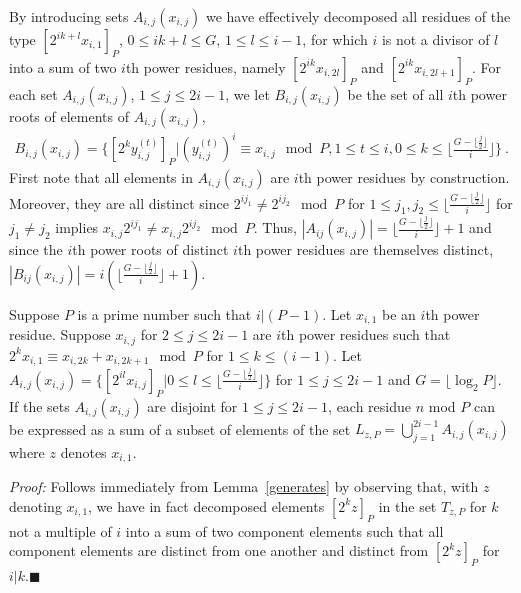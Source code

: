 By introducing sets $A_{i,j}(x_{i,j})$ we have effectively
decomposed all residues of the type $[2^{ik+l}x_{i,1}]_P$, $0 \leq
ik+l \leq G$, $1 \leq l \leq i-1$, for which $i$ is not a divisor of
$l$ into a sum of two $i$th power residues, namely
$[2^{ik}x_{i,2l}]_P$ and $[2^{ik}x_{i,2l+1}]_P$. For each set
$A_{i,j}(x_{i,j})$, $1 \leq j \leq 2i-1$, we let $B_{i,j}(x_{i,j})$
be the set of all $i$th power roots of elements of
$A_{i,j}(x_{i,j})$,
\begin{eqnarray}\label{bzi2l}
B_{i,j}(x_{i,j}) =\{ [2^{k}y_{i,j}^{(t)}]_P| (y_{i,j}^{(t)})^i
\equiv x_{i,j} \mod P, 1 \leq t \leq i, 0 \leq k \leq \lfloor
\frac{G-\lfloor \frac{j}{2} \rfloor}{i} \rfloor \}~.
\end{eqnarray}
First note that all elements in $A_{i,j}(x_{i,j})$ are $i$th power
residues by construction. Moreover, they are all distinct since
$2^{ij_1} \neq 2^{ij_2} \mod P$ for $1 \leq j_1,j_2 \leq \lfloor
\frac{G-\lfloor\frac{j}{2} \rfloor}{i} \rfloor$ for $j_1\neq j_2$
implies $x_{i,j}2^{ij_1} \neq x_{i,j}2^{ij_2} \mod P$. Thus,
$|A_{ij}(x_{i,j})|=\lfloor \frac{G-\lfloor \frac{j}{2}\rfloor}{i}
\rfloor+1$ and since the $i$th power roots of distinct $i$th power
residues are themselves distinct, $|B_{ij}(x_{i,j})|=i\left(\lfloor
\frac{G-\lfloor \frac{j}{2}\rfloor}{i} \rfloor+1\right)$.

\begin{lemma}\label{generates1} Suppose $P$ is a prime number such that $i|(P-1)$.
Let $x_{i,1}$ be an $i$th power residue. Suppose $x_{i,j}$ for $2
\leq j \leq 2i-1$ are $i$th power residues such that $2^{k}x_{i,1}
\equiv x_{i,2k}+x_{i,2k+1} \mod P$ for $1 \leq k \leq(i-1)$. Let
$A_{i,j}(x_{i,j}) =\{[2^{il}x_{i,j}]_P| 0 \leq l \leq \lfloor
\frac{G-\lfloor \frac{j}{2}\rfloor}{i}\rfloor\}$ for $1 \leq j \leq
2i-1$ and $G=\lfloor \log_2P \rfloor$. If the sets
$A_{i,j}(x_{i,j})$ are disjoint for $1 \leq j \leq 2i-1$, each
residue $n$ mod $P$ can be expressed as a sum of a subset of
elements of the set $L_{z,P}= \bigcup_{j=1}^{2i-1} A_{i,j}(x_{i,j})$
where $z$ denotes $x_{i,1}$.
\end{lemma}
\noindent \textit{Proof:} Follows immediately from
Lemma~\ref{generates} by observing that, with $z$ denoting
$x_{i,1}$, we have in fact decomposed elements $[2^{k}z]_P$ in the
set $T_{z,P}$ for $k$ not a multiple of $i$ into a sum of two
component elements such that all component elements are distinct
from one another and distinct from $[2^kz]_P$ for
$i|k$.\hfill$\blacksquare$

